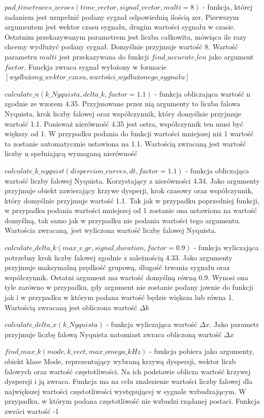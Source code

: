 $pad\_timetraces\_zeroes(time\_vector, signal\_vector, multi=8)$ - funkcja, której zadaniem jest uzupełnić podany sygnał odpowiednią ilością zer. Pierwszym argumentem jest wektor czasu sygnału, drugim wartości sygnału w czasie. Ostatnim przekazywanym parametrem jest liczba całkowita, mówiąca ile razy chcemy wydłużyć podany sygnał. Domyślnie przyjmuje wartość 8. Wartość parametru $multi$ jest przekazywana do funkcji $find\_accurate\_len$ jako argument $factor$. Funckja zwraca sygnał wyłożony w formacie $[wydłużony\_wektor\_czasu, wartości\_wydłużonego\_sygnału]$

$calculate\_n(k\_Nyquista, delta\_k, factor=1.1)$ - funkcja obliczająca wartość n zgodnie ze wzorem 4.35. Przyjmowane przez nią argumenty to liczba falowa Nyquista, krok liczby falowej oraz współczynnik, który domyślnie przyjmuje wartość 1.1. Ponieważ nierówność 4.35 jest ostra, współczynnik ten musi być większy od 1. W przypadku podania do funkcji wartości mniejszej niż 1 wartość ta zostanie automatycznie ustawiona na 1.1. Wartością zwracaną jest wartość liczby n spełniającą wymaganą nierówność

$calculate\_k\_nyquist(dispercion\_curves, dt, factor=1.1)$ - funkcja obliczająca wartość liczby falowej Nyquista. Korzystający z nierówności 4.34. Jako argumenty przyjmuje obiekt zawierający krzywe dysperji, krok czasowy oraz współczynnik, który domyślnie przyjmuje wartość 1.1. Tak jak w przypadku poprzedniej funkcji, w przypadku podania wartości mniejszej od 1 zostanie ona ustawiona na wartość domyślną, tak samo jak w przypadku nie podania wartości tego argumentu. Wartościa zwracaną, jest wyliczona wartość liczby falowej Nyquista.

$calculate\_delta\_k(max\_v\_gr, signal\_duration, factor=0.9)$ - funkcja wyliczająca potrzebny krok liczby falowej zgodnie z zależnością 4.33. Jako argumenty przyjmuje maksymalną prędkość grupową, długość trwania sygnału oraz współczynnik. Ostatni argument ma wartość domyślną równą 0.9. Wynosi ona tyle zarówno w przypadku, gdy argument nie zostanie podany jawnie do funkcji jak i w przypadku w którym podana wartość będzie większa lub równa 1. Wartością zwracaną jest obliczona wartość $\Delta k$

$calculate\_delta\_x(k\_Nyquista)$ - funkcja wyliczająca wartość $\Delta x$. Jako parametr przyjmuje liczbę falową Nyquista natomiast zwraca obliczoną wartość $\Delta x$

$find\_max\_k(mode, k\_vect, max\_omega\_kHz)$ - funkcja pobiera jako argumenty, obiekt klase Mode, reprezentujący wybraną krzywą dyspersji, wektor liczb falowych oraz wartość częstotliwości. Na ich podstawie oblicza wartość krzywej dyspersji i ją zwraca. Funkcja ma na celu znalezienie wartości liczby falowej dla największej wartości częstotliwości występującej w sygnale wzbudzającym. W przypadku, w którym podana częstotliwość nie wzbudzi rządanej postaci. Funkcja zwróci wartość -1

